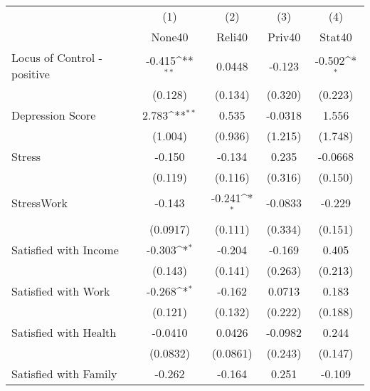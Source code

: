{
\def\sym#1{\ifmmode^{#1}\else\(^{#1}\)\fi}
\begin{tabular}{l*{4}{c}}
\hline\hline
            &\multicolumn{1}{c}{(1)}&\multicolumn{1}{c}{(2)}&\multicolumn{1}{c}{(3)}&\multicolumn{1}{c}{(4)}\\
            &\multicolumn{1}{c}{None40}&\multicolumn{1}{c}{Reli40}&\multicolumn{1}{c}{Priv40}&\multicolumn{1}{c}{Stat40}\\
\hline
Locus of Control - positive&      -0.415\sym{**} &      0.0448         &      -0.123         &      -0.502\sym{*}  \\
            &     (0.128)         &     (0.134)         &     (0.320)         &     (0.223)         \\
[1em]
Depression Score&       2.783\sym{**} &       0.535         &     -0.0318         &       1.556         \\
            &     (1.004)         &     (0.936)         &     (1.215)         &     (1.748)         \\
[1em]
Stress      &      -0.150         &      -0.134         &       0.235         &     -0.0668         \\
            &     (0.119)         &     (0.116)         &     (0.316)         &     (0.150)         \\
[1em]
StressWork  &      -0.143         &      -0.241\sym{*}  &     -0.0833         &      -0.229         \\
            &    (0.0917)         &     (0.111)         &     (0.334)         &     (0.151)         \\
[1em]
Satisfied with Income&      -0.303\sym{*}  &      -0.204         &      -0.169         &       0.405         \\
            &     (0.143)         &     (0.141)         &     (0.263)         &     (0.213)         \\
[1em]
Satisfied with Work&      -0.268\sym{*}  &      -0.162         &      0.0713         &       0.183         \\
            &     (0.121)         &     (0.132)         &     (0.222)         &     (0.188)         \\
[1em]
Satisfied with Health&     -0.0410         &      0.0426         &     -0.0982         &       0.244         \\
            &    (0.0832)         &    (0.0861)         &     (0.243)         &     (0.147)         \\
[1em]
Satisfied with Family&      -0.262         &      -0.164         &       0.251         &      -0.109         \\

\end{tabular}}
